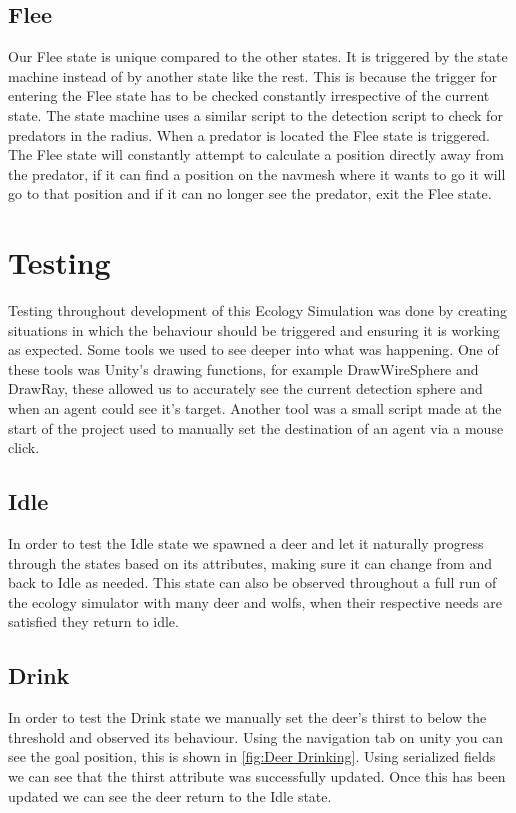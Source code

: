 \documentclass[a4paper, oneside, 11pt]{report}
\begin{document}
\section{Flee}
	Our Flee state is unique compared to the other states. It is triggered by the state machine instead of by another state like the rest. This is because the trigger for entering the Flee state has to be checked constantly irrespective of the current state. The state machine uses a similar script to the detection script to check for predators in the radius. When a predator is located the Flee state is triggered. The Flee state will constantly attempt to calculate a position directly away from the predator, if it can find a position on the navmesh where it wants to go it will go to that position and if it can no longer see the predator, exit the Flee state. 

\chapter{Testing}

	Testing throughout development of this Ecology Simulation was done by creating situations in which the behaviour should be triggered and ensuring it is working as expected. Some tools we used to see deeper into what was happening. One of these tools was Unity's drawing functions, for example DrawWireSphere and DrawRay, these allowed us to accurately see the current detection sphere and when an agent could see it's target. Another tool was a small script made at the start of the project used to manually set the destination of an agent via a mouse click. 

\section{Idle}
	In order to test the Idle state we spawned a deer and let it naturally progress through the states based on its attributes, making sure it can change from and back to Idle as needed. This state can also be observed throughout a full run of the ecology simulator with many deer and wolfs, when their respective needs are satisfied they return to idle.
\section{Drink}
	In order to test the Drink state we manually set the deer's thirst to below the threshold and observed its behaviour. Using the navigation tab on unity you can see the goal position, this is shown in \ref{fig:Deer Drinking}. Using serialized fields we can see that the thirst attribute was successfully updated. Once this has been updated we can see the deer return to the Idle state. 
	
\end{document}
